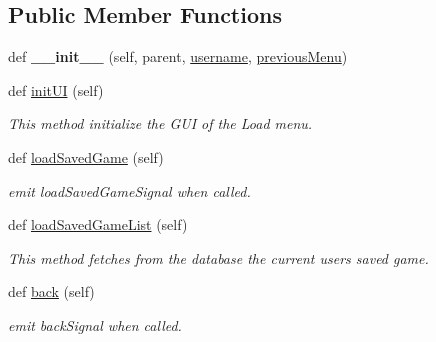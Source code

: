 \subsection*{Public Member Functions}
\begin{DoxyCompactItemize}
\item 
\hypertarget{classsrc_1_1load__menu_1_1_load_menu_a6b067e9ede752fd13ed4df84570083b7}{}def {\bfseries \+\_\+\+\_\+init\+\_\+\+\_\+} (self, parent, \hyperlink{classsrc_1_1load__menu_1_1_load_menu_ab1c940f6352015a62d85b668bc6ebb01}{username}, \hyperlink{classsrc_1_1load__menu_1_1_load_menu_a266279b7ed3e68889b07c1785251c806}{previous\+Menu})\label{classsrc_1_1load__menu_1_1_load_menu_a6b067e9ede752fd13ed4df84570083b7}

\item 
def \hyperlink{classsrc_1_1load__menu_1_1_load_menu_ae10c4104f4245eaba4772a7f29485ff4}{init\+U\+I} (self)
\begin{DoxyCompactList}\small\item\em This method initialize the G\+U\+I of the Load menu. \end{DoxyCompactList}\item 
def \hyperlink{classsrc_1_1load__menu_1_1_load_menu_ac3ab22ee56c51e7cb02f27344d6bfcbd}{load\+Saved\+Game} (self)
\begin{DoxyCompactList}\small\item\em emit load\+Saved\+Game\+Signal when called. \end{DoxyCompactList}\item 
def \hyperlink{classsrc_1_1load__menu_1_1_load_menu_af7b9c789c68fb85b2d4e2bfd211e201d}{load\+Saved\+Game\+List} (self)
\begin{DoxyCompactList}\small\item\em This method fetches from the database the current user\textquotesingle{}s saved game. \end{DoxyCompactList}\item 
def \hyperlink{classsrc_1_1load__menu_1_1_load_menu_ac1756d59b9d5d3c026d4cb971bb6a657}{back} (self)
\begin{DoxyCompactList}\small\item\em emit back\+Signal when called. \end{DoxyCompactList}\end{DoxyCompactItemize}
